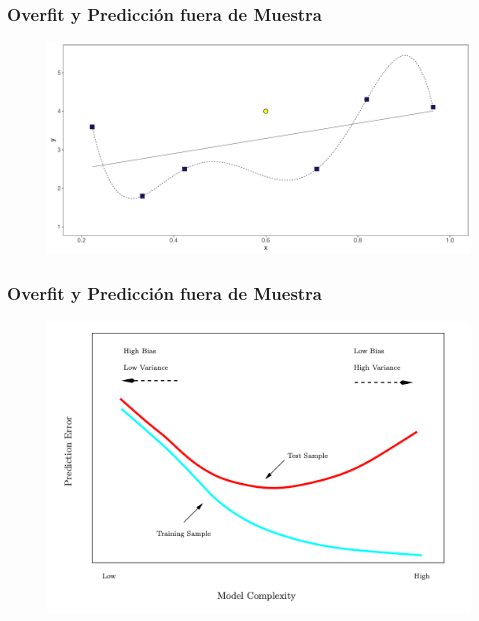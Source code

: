 \documentclass[
  shownotes,
  xcolor={svgnames},
  hyperref={colorlinks,citecolor=DarkBlue,linkcolor=andesred,urlcolor=DarkBlue}
  , aspectratio=169]{beamer}
\begin{document}
\begin{frame}
\frametitle{Overfit y Predicción fuera de Muestra}


        \begin{figure}[H] \centering
            \captionsetup{justification=centering}
              \includegraphics[scale=0.4]{figures/fig_all_sample_polys.pdf}
 \end{figure}


\end{frame}
\begin{frame}
\frametitle{Overfit y Predicción fuera de Muestra}



\begin{figure}[H] \centering
            \captionsetup{justification=centering}  
            \includegraphics[scale=.6]{figures/train_test_error.png}
    \end{figure}

\end{frame}
\end{document}
